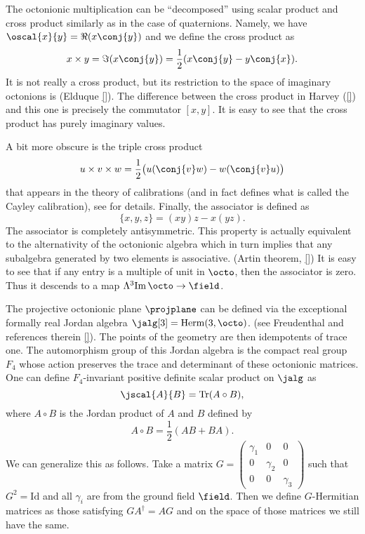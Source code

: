 The octonionic multiplication  can be ``decomposed'' using scalar product and cross product similarly  as in the case of quaternions. Namely, we have $\oscal{x}{y} = \Re( x\conj{y})$ and we define the cross product as \[x \times y = \Im (x\conj{y}) = \frac{1}{2}( x\conj{y} - y\conj{x}).\] It is not really a cross product, but its restriction to the space of imaginary octonions is (Elduque \ref{}). The difference between the cross product in Harvey (\ref{}) and this one is precisely the commutator $[x,y]$. It is easy to see that the cross product has purely imaginary values.


A bit more obscure is the triple cross product 
\[
u \times v \times w = \frac{1}{2}\bigl( u(\conj{v}w) - w(\conj{v}u) \bigr)
\]
that appears in the theory of calibrations (and in fact defines what is called the Cayley calibration), see \cite{harvey, salamon} for details. Finally, the associator is defined as
\[
\{ x,y,z \} = (xy)z - x(yz).
\]
The associator is completely antisymmetric. This property is actually equivalent to the alternativity of the octonionic algebra which in turn implies that any subalgebra generated by two elements is associative. (Artin theorem, \ref{}) It is easy to see that if any entry is a multiple of unit in $\octo$, then the associator is zero. Thus it descends to a map $\Lambda^3 \mathrm{Im}\, \octo \to \field$.

The projective octonionic plane $\projplane$ can be defined via the exceptional formally real Jordan algebra $\jalg[3] = \mathrm{Herm}(3,\octo)$. (see Freudenthal and references therein \ref{}). The points of the geometry are then idempotents of trace one. The automorphism group of this Jordan algebra is the compact real group $F_4$ whose action preserves the trace and determinant of these octonionic matrices. One can define $F_4$-invariant positive definite scalar product on $\jalg$ as
\[
 \jscal{A}{B} = \mathrm{Tr}(A \circ B),
\]
where $A \circ B$ is the Jordan product of $A$ and $B$ defined by
\[
 A \circ B = \frac{1}{2} \left( AB + BA \right).
\]
We can generalize this as follows. Take a matrix $G=\begin{pmatrix} \gamma_1 & 0 & 0 \\ 0 & \gamma_2 & 0 \\ 0 & 0 & \gamma_3\end{pmatrix}$ such that $G^2 = \mathrm{Id}$ and all $\gamma_i$ are from the ground field $\field$. Then we define $G$-Hermitian matrices as those satisfying $GA^\dagger = AG$ and on the space of those matrices we still have the same.


